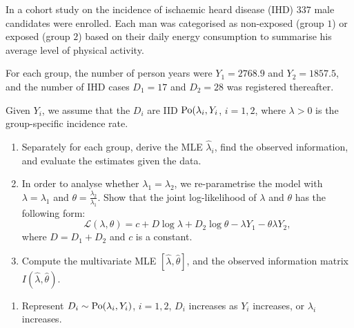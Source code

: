 \documentclass[10pt, a4paper]{article}
\begin{document}
\begin{problem}
    In a cohort study on the incidence of ischaemic heard disease
    (IHD)
    $337$ male candidates were enrolled.
    Each man was categorised as non-exposed
    (group $1$)
    or exposed
    (group $2$)
    based on their daily energy consumption to summarise his average level of physical activity.
    
    For each group,
    the number of person years were $Y_1 = 2768.9$ and $Y_2 = 1857.5$,
    and the number of IHD cases $D_1 = 17$ and $D_2 = 28$ was registered thereafter.

    Given $Y_i$,
    we assume that the $D_i$ are IID $\operatorname{Po}(\lambda_i, Y_i$,
    $i = 1, 2$,
    where $\lambda > 0$ is the group-specific incidence rate.

    \begin{enumerate}[label = (\alph*)]
        \item Separately for each group,
        derive the MLE $\hat{\lambda}_i$,
        find the observed information,
        and evaluate the estimates given the data.

        \item In order to analyse whether $\lambda_1 = \lambda_2$,
        we re-parametrise the model with $\lambda = \lambda_1$ and $\theta = \frac{\lambda_2}{\lambda_1}$.
        Show that the joint log-likelihood of $\lambda$ and $\theta$ has the following form:
        \[
        \mathcal{L}(\lambda, \theta) = c + D\log{\lambda} + D_2\log{\theta} - \lambda Y_1 - \theta\lambda Y_2,
        \]
        where $D = D_1 + D_2$ and $c$ is a constant.

        \item Compute the multivariate MLE $[\hat{\lambda}, \hat{\theta}]$,
        and the observed information matrix $I(\hat{\lambda}, \hat{\theta})$.
    \end{enumerate}

    \begin{solution}
        \begin{enumerate}[label = (\alph*)]
            \item Represent $D_i \sim \operatorname{Po}(\lambda_i, Y_i)$,
            $i = 1, 2$,
            $D_i$ increases as $Y_i$ increases,
            or $\lambda_i$ increases.


\end{enumerate}
\end{solution}
\end{problem}
\end{document}
